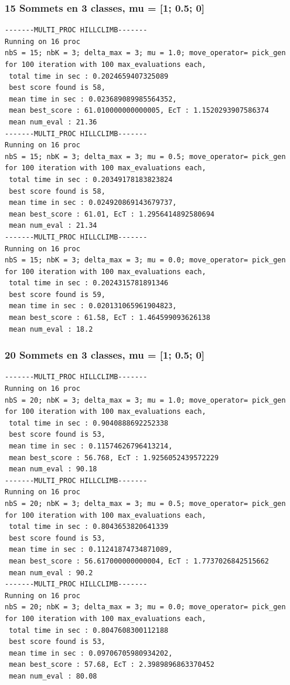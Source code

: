 \documentclass[a4paper]{article}
\begin{document}
\subsubsection{15 Sommets en 3 classes, mu = [1; 0.5; 0]}
\begin{verbatim}
-------MULTI_PROC HILLCLIMB-------
Running on 16 proc
nbS = 15; nbK = 3; delta_max = 3; mu = 1.0; move_operator= pick_gen
for 100 iteration with 100 max_evaluations each, 
 total time in sec : 0.2024659407325089
 best score found is 58,
 mean time in sec : 0.023689089985564352,
 mean best_score : 61.010000000000005, EcT : 1.1520293907586374
 mean num_eval : 21.36
-------MULTI_PROC HILLCLIMB-------
Running on 16 proc
nbS = 15; nbK = 3; delta_max = 3; mu = 0.5; move_operator= pick_gen
for 100 iteration with 100 max_evaluations each, 
 total time in sec : 0.20349178183823824
 best score found is 58,
 mean time in sec : 0.024920869143679737,
 mean best_score : 61.01, EcT : 1.2956414892580694
 mean num_eval : 21.34
-------MULTI_PROC HILLCLIMB-------
Running on 16 proc
nbS = 15; nbK = 3; delta_max = 3; mu = 0.0; move_operator= pick_gen
for 100 iteration with 100 max_evaluations each, 
 total time in sec : 0.2024315781891346
 best score found is 59,
 mean time in sec : 0.020131065961904823,
 mean best_score : 61.58, EcT : 1.464599093626138
 mean num_eval : 18.2
\end{verbatim}
\subsubsection{20 Sommets en 3 classes, mu = [1; 0.5; 0]}
\begin{verbatim}
-------MULTI_PROC HILLCLIMB-------
Running on 16 proc
nbS = 20; nbK = 3; delta_max = 3; mu = 1.0; move_operator= pick_gen
for 100 iteration with 100 max_evaluations each, 
 total time in sec : 0.9040888692252338
 best score found is 53,
 mean time in sec : 0.11574626796413214,
 mean best_score : 56.768, EcT : 1.9256052439572229
 mean num_eval : 90.18
-------MULTI_PROC HILLCLIMB-------
Running on 16 proc
nbS = 20; nbK = 3; delta_max = 3; mu = 0.5; move_operator= pick_gen
for 100 iteration with 100 max_evaluations each, 
 total time in sec : 0.8043653820641339
 best score found is 53,
 mean time in sec : 0.11241874734871089,
 mean best_score : 56.617000000000004, EcT : 1.7737026842515662
 mean num_eval : 90.2
-------MULTI_PROC HILLCLIMB-------
Running on 16 proc
nbS = 20; nbK = 3; delta_max = 3; mu = 0.0; move_operator= pick_gen
for 100 iteration with 100 max_evaluations each, 
 total time in sec : 0.8047608300112188
 best score found is 53,
 mean time in sec : 0.09706705980934202,
 mean best_score : 57.68, EcT : 2.3989896863370452
 mean num_eval : 80.08
\end{verbatim}
\end{document}
